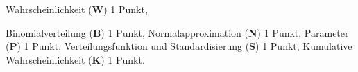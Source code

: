 \begin{bewertung}
\begin{teilaufgaben}
\item
Wahrscheinlichkeit ({\bf W}) 1 Punkt,
\item
Binomialverteilung ({\bf B}) 1 Punkt,
Normalapproximation ({\bf N}) 1 Punkt,
Parameter ({\bf P}) 1 Punkt,
Verteilungsfunktion und Standardisierung ({\bf S}) 1 Punkt,
Kumulative Wahrscheinlichkeit ({\bf K}) 1 Punkt.
\end{teilaufgaben}
\end{bewertung}

